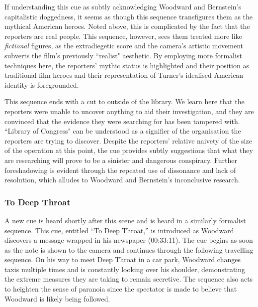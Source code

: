 If understanding this cue as subtly acknowledging Woodward and Bernstein's capitalistic doggedness, it seems as though this sequence transfigures them as the mythical American heroes.
Noted above, this is complicated by the fact that the reporters are real people.
This sequence, however, sees them treated more like \textit{fictional} figures, as the extradiegetic score and the camera's artistic movement subverts the film's previously ``realist" aesthetic.
By employing more formalist techniques here, the reporters' mythic status is highlighted and their position as traditional film heroes and their representation of Turner's idealised American identity is foregrounded.



This sequence ends with a cut to outside of the library.
We learn here that the reporters were unable to uncover anything to aid their investigation, and they are convinced that the evidence they were searching for has been tampered with.
``Library of Congress" can be understood as a signifier of the organisation the reporters are trying to discover.
Despite the reporters' relative naivety of the size of the operation at this point, the cue provides subtly suggestions that what they are researching will prove to be a sinister and dangerous conspiracy.
Further foreshadowing is evident through the repeated use of dissonance and lack of resolution, which alludes to Woodward and Bernstein's inconclusive research.


\subsubsection{To Deep Throat}

A new cue is heard shortly after this scene and is heard in a similarly formalist sequence.
This cue, entitled ``To Deep Throat,” is introduced as Woodward discovers a message wrapped in his newspaper (00:33:11).
The cue begins as soon as the note is shown to the camera and continues through the following travelling sequence.
On his way to meet Deep Throat in a car park, Woodward changes taxis multiple times and is constantly looking over his shoulder, demonstrating the extreme measures they are taking to remain secretive.
The sequence also acts to heighten the sense of paranoia since the spectator is made to believe that Woodward is likely being followed.

